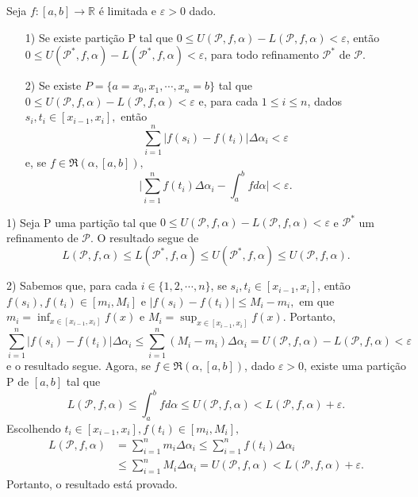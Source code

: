 \documentclass[analysis_notes.tex]{subfiles}
\begin{document}
\begin{theorem*}
	Seja \(f:[a, b]\rightarrow \mathbb{R}\) é limitada e \(\varepsilon  > 0\) dado.
	\begin{itemize}
		\item[1)] Se existe parti\c cão P tal que \(0\leq U(\mathcal{P}, f, \alpha ) - L(\mathcal{P}, f, \alpha )  < \varepsilon \), então
		      \(0\leq U(\mathcal{P}^{*}, f, \alpha ) - L(\mathcal{P}^{*}, f, \alpha ) < \varepsilon \), para todo refinamento \(\mathcal{P}^{*}\) de \(\mathcal{P}.\)
		\item[2)] Se existe \(P = \{a = x_{0}, x_{1}, \cdots, x_{n} = b\}\) tal que \(0\leq U(\mathcal{P}, f, \alpha ) - L(\mathcal{P}, f, \alpha ) < \varepsilon \) e, para
		      cada \(1\leq i\leq n\), dados \(s_{i}, t_{i}\in [x_{i-1}, x_{i}], \) então
		      \[
			      \sum\limits_{i=1}^{n}|f(s_{i}) - f(t_{i})|\Delta \alpha_{i} < \varepsilon
		      \]
		      e, se \(f\in \mathfrak{R}(\alpha , [a, b]),\)
		      \[
			      \biggl|\sum\limits_{i=1}^{n}f(t_{i})\Delta \alpha_{i} - \int_{a}^{b}f d\alpha\biggr| < \varepsilon .
		      \]
	\end{itemize}
\end{theorem*}
\begin{proof*}
	1) Seja P uma parti\c cão tal que \(0\leq U(\mathcal{P}, f, \alpha ) - L(\mathcal{P}, f, \alpha ) < \varepsilon \) e
	\(\mathcal{P}^{*}\) um refinamento de \(\mathcal{P}.\) O resultado segue de
	\[
		L(\mathcal{P}, f, \alpha )\leq L(\mathcal{P}^{*}, f, \alpha )\leq U(\mathcal{P}^{*}, f, \alpha )\leq U(\mathcal{P}, f, \alpha ).
	\]

	2) Sabemos que, para cada \(i\in\{1, 2, \cdots, n\}\), se \(s_{i}, t_{i}\in [x_{i-1}, x_{i}]\), então
	\(f(s_{i}), f(t_{i})\in[m_{i}, M_{i}]\) e \(|f(s_{i})-f(t_{i})|\leq M_{i} - m_{i},\) em que
	\(m_{i} = \inf_{x\in[x_{i-1}, x_{i}]}f(x)\) e \(M_{i}=\sup_{x\in[x_{i-1}, x_{i}]}f(x)\). Portanto,
	\[
		\sum\limits_{i=1}^{n}|f(s_{i})-f(t_{i})|\Delta \alpha_{i}\leq \sum\limits_{i=1}^{n}(M_{i}-m_{i})\Delta \alpha_{i} = U(\mathcal{P}, f, \alpha )-L(\mathcal{P}, f, \alpha ) <\varepsilon
	\]
	e o resultado segue. Agora, se \(f\in \mathfrak{R}(\alpha , [a, b])\), dado \(\varepsilon >0\), existe uma
	parti\c cão P de \([a, b]\) tal que
	\[
		L(\mathcal{P}, f, \alpha )\leq \int_{a}^{b}f d\alpha \leq U(\mathcal{P}, f, \alpha ) < L(\mathcal{P}, f, \alpha ) + \varepsilon .
	\]
	Escolhendo \(t_{i}\in[x_{i-1}, x_{i}], f(t_{i})\in[m_{i}, M_{i}],\)
	\begin{align*}
		L(\mathcal{P}, f, \alpha ) & = \sum\limits_{i=1}^{n}m_{i}\Delta \alpha_{i}\leq \sum\limits_{i=1}^{n}f(t_{i})\Delta \alpha_{i}                         \\
		                           & \leq \sum\limits_{i=1}^{n}M_{i}\Delta\alpha_{i} = U(\mathcal{P}, f, \alpha ) < L(\mathcal{P}, f, \alpha ) + \varepsilon.
	\end{align*}
	Portanto, o resultado está provado. \qedsymbol
\end{proof*}
\end{document}
